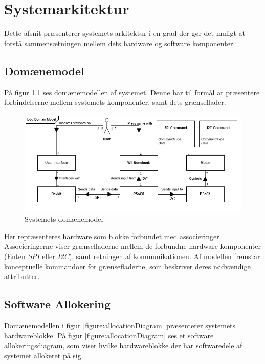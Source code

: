 \chapter{Systemarkitektur}

Dette afsnit præsenterer systemets arkitektur i en grad der gør det muligt at forstå sammensætningen mellem dets hardware og software komponenter.

\section{Domænemodel}

På figur \ref{figure:domainModel} ses domænemodellen af systemet. Denne har til formål at præsentere forbindelserne mellem systemets komponenter, samt dets grænseflader.

\begin{figure}[H]
	\centering
	\includegraphics[width=\textwidth]{SystemArkitektur/images/DomainModel.PNG}
	\caption{Systemets domænemodel}
	\label{figure:domainModel}
\end{figure}

Her repræsenteres hardware som blokke forbundet med associeringer. Associeringerne viser grænsefladerne mellem de forbundne hardware komponenter (Enten \textit{SPI} eller \textit{I2C}), samt retningen af kommunikationen. Af modellen fremstår konceptuelle kommandoer for grænsefladerne, som beskriver deres nødvændige attributter.

\section{Software Allokering}

Domænemodellen i figur \ref{figure:allocationDiagram} præsenterer systemets hardwareblokke. På figur \ref{figure:allocationDiagram} ses et software allokeringsdiagram, som viser hvilke hardwareblokke der har softwaredele af systemet allokeret på sig. 

